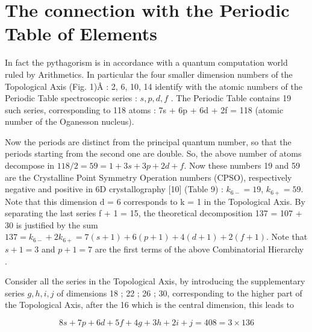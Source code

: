 \documentclass[a4paper,9pt]{article}
\begin{document}

\section{The connection with the Periodic Table of Elements}

     In fact the pythagorism is in accordance with a quantum computation world ruled by Arithmetics. In particular the four smaller dimension numbers of the Topological Axis (Fig. 1)Â : 2, 6, 10, 14 identify with the atomic numbers of the Periodic Table spectroscopic series : $s, p, d, f$ . The Periodic Table contains 19 such series, corresponding to 118 atoms : 7s + 6p + 6d + 2f = 118 (atomic number of the Oganesson nucleus). 

     Now the periods are distinct from the principal quantum number, so that the periods starting from the second one are double. So, the above number of atoms decompose in $118/2 = 59 = 1 + 3s + 3p + 2d + f$. Now these numbers 19 and 59 are the Crystalline Point Symmetry Operation numbers (CPSO), respectively negative and positive in 6D crystallography [10] (Table 9) : $k_{6-} = 19$, $k_{6+} = 59$. Note that this dimension d = 6 corresponds to k = 1 in the Topological Axis. By separating the last series f + 1 = 15, the theoretical decomposition 137 = 107 + 30 is justified by the sum $137 =  k_{6-} + 2k_{6+} = 7(s +1) + 6(p +1) + 4(d +1) + 2(f +1)$. Note that $s + 1 = 3$ and $p + 1 = 7$ are the first terms of the above Combinatorial Hierarchy\cite{Bastin} .

     Consider all the series in the Topological Axis, by introducing the supplementary series $g, h, i, j$ of dimensions 18 ; 22 ; 26 ; 30, corresponding to the higher part of the Topological Axis, after the 16 which is the central dimension, this leads to
     
     \begin{equation}
      8s + 7p + 6 d + 5f + 4g + 3h + 2i + j = 408 = 3 \times 136   
     \end{equation}
      
\end{document}
